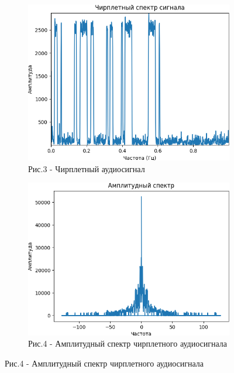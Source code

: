 \begin{figure}[H]
   \centering
   \begin{subfigure}{0.45\textwidth}
   	\centering
   	\includegraphics[width=\textwidth,height=0.8\textwidth]{media/ict/image66}
   	\caption*{Рис.3 - Чирплетный аудиосигнал}
   \end{subfigure}
   \begin{subfigure}{0.45\textwidth}
   	\centering
   	\includegraphics[width=\textwidth,height=0.8\textwidth]{media/ict/image67}
   	\caption*{Рис.4 - Амплитудный спектр чирплетного аудиосигнала}
   \end{subfigure}
\end{figure}

